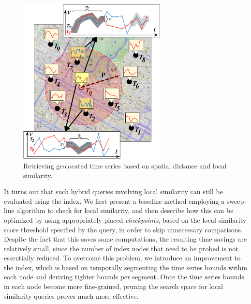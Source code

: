 

\begin{figure}[!t]
 \centering
 \includegraphics[width=75mm]{Figures/local_sim_geoloc.png}
\caption{Retrieving geolocated time series based on spatial distance and local similarity.}
\label{fig:example_query}
\end{figure}


It turns out that such hybrid queries involving local similarity can still be evaluated using the \btsr index. We first present a baseline method employing a sweep-line algorithm to check for local similarity, and then describe how this can be optimized by using appropriately placed {\em checkpoints}, based on the local similarity score threshold specified by the query, in order to skip unnecessary comparisons. Despite the fact that this saves some computations, the resulting time savings are relatively small, since the number of index nodes that need to be probed is not essentially reduced. To overcome this problem, we introduce an improvement to the \btsr index, which is based on temporally segmenting the time series bounds within each node and deriving tighter bounds per segment. Once the time series bounds in each node become more fine-grained, pruning the search space for local similarity queries proves much more effective.

